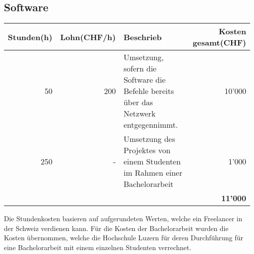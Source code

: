 \subsection{Software}
\begin{tabularx}{\textwidth}{|r|r|X|r|}
	\hline
	\textbf{Stunden(h)} & \textbf{Lohn(CHF/h)} & \textbf{Beschrieb} & \textbf{Kosten gesamt(CHF)} \\
	\hline
	50 & 200 & Umsetzung, sofern die Software die Befehle bereits über das Netzwerk entgegennimmt. & 10'000 \\
	\hline
	250 & - & Umsetzung des Projektes von einem Studenten im Rahmen einer Bachelorarbeit & 1'000 \\
	& & & \textbf{11'000} \\
	\hline
\end{tabularx}

Die Stundenkosten basieren auf aufgerundeten Werten, welche ein Freelancer in der Schweiz verdienen kann.
Für die Kosten der Bachelorarbeit wurden die Kosten übernommen, welche die Hochschule Luzern für deren Durchführung für eine Bachelorarbeit mit einem einzelnen Studenten verrechnet.
